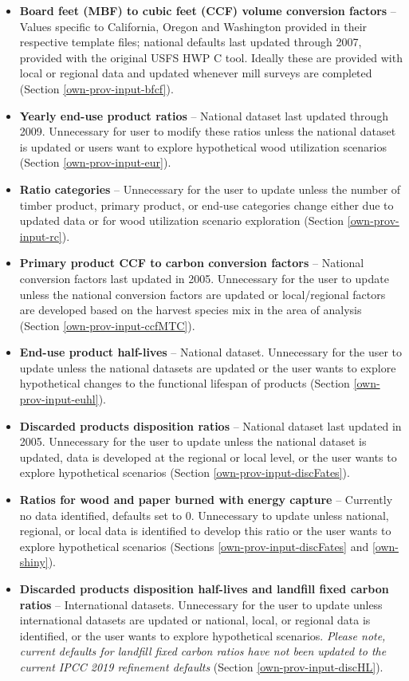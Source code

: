 \documentclass[
  openany]{book}
\begin{document}
\begin{itemize}
\item
  \textbf{Board feet (MBF) to cubic feet (CCF) volume conversion factors} -- Values specific to California, Oregon and Washington provided in their respective template files; national defaults last updated through 2007, provided with the original USFS HWP C tool. Ideally these are provided with local or regional data and updated whenever mill surveys are completed (Section \ref{own-prov-input-bfcf}).
\item
  \textbf{Yearly end-use product ratios} -- National dataset last updated through 2009. Unnecessary for user to modify these ratios unless the national dataset is updated or users want to explore hypothetical wood utilization scenarios (Section \ref{own-prov-input-eur}).
\item
  \textbf{Ratio categories} -- Unnecessary for the user to update unless the number of timber product, primary product, or end-use categories change either due to updated data or for wood utilization scenario exploration (Section \ref{own-prov-input-rc}).
\item
  \textbf{Primary product CCF to carbon conversion factors} -- National conversion factors last updated in 2005. Unnecessary for the user to update unless the national conversion factors are updated or local/regional factors are developed based on the harvest species mix in the area of analysis (Section \ref{own-prov-input-ccfMTC}).
\item
  \textbf{End-use product half-lives} -- National dataset. Unnecessary for the user to update unless the national datasets are updated or the user wants to explore hypothetical changes to the functional lifespan of products (Section \ref{own-prov-input-euhl}).
\item
  \textbf{Discarded products disposition ratios} -- National dataset last updated in 2005. Unnecessary for the user to update unless the national dataset is updated, data is developed at the regional or local level, or the user wants to explore hypothetical scenarios (Section \ref{own-prov-input-discFates}).
\item
  \textbf{Ratios for wood and paper burned with energy capture} -- Currently no data identified, defaults set to 0. Unnecessary to update unless national, regional, or local data is identified to develop this ratio or the user wants to explore hypothetical scenarios (Sections \ref{own-prov-input-discFates} and \ref{own-shiny}).
\item
  \textbf{Discarded products disposition half-lives and landfill fixed carbon ratios} -- International datasets. Unnecessary for the user to update unless international datasets are updated or national, local, or regional data is identified, or the user wants to explore hypothetical scenarios. \emph{Please note, current defaults for landfill fixed carbon ratios have not been updated to the current IPCC 2019 refinement defaults} (Section \ref{own-prov-input-discHL}).

\end{itemize}
\end{document}
